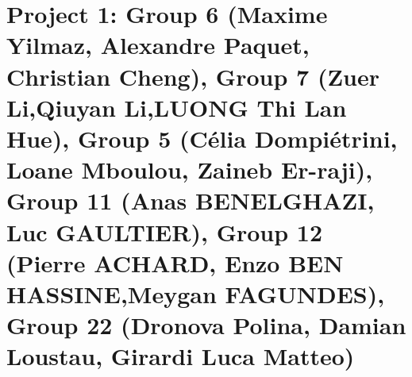 \documentclass{article}
\begin{document}


\section*{Project 1:  Group 6 (Maxime Yilmaz, Alexandre Paquet, Christian Cheng), Group 7 (Zuer Li,Qiuyan Li,LUONG Thi Lan Hue), Group 5 (Célia Dompiétrini, Loane Mboulou,  Zaineb Er-raji), Group 11 (Anas BENELGHAZI, Luc GAULTIER), Group 12
(Pierre ACHARD, Enzo BEN HASSINE,Meygan FAGUNDES), Group 22 (Dronova Polina, Damian Loustau, Girardi Luca Matteo)}
\end{document}
